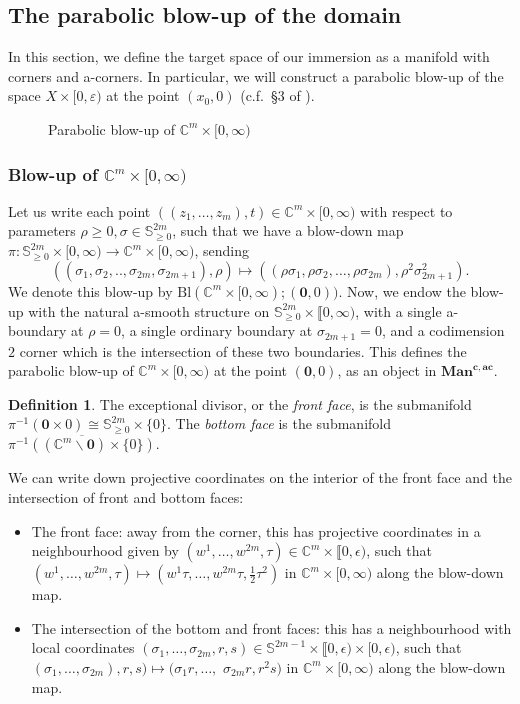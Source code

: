\documentclass[10pt, a4paper]{article}
\theoremstyle{plain}%
\theoremstyle{definition}
\newtheorem{defn}[theorem]{Definition}
\numberwithin{figure}{section}
\numberwithin{equation}{section}
\newcommand{\bC}{\mathbb{C}}
\newcommand{\mancac}{\mathbf{Man}^{\mathbf{c,ac}}}
\newcommand{\ep}{\varepsilon}
\newcommand{\Bl}{\mathrm{Bl}(\mathbb{C}^m\times[0,\infty); (\mathbf{0},0))}
\begin{document}
\subsection{The parabolic blow-up of the domain}
In this section, we define the target space of our immersion as a manifold with corners and a-corners. In particular, we will construct a parabolic blow-up of the space $X\times [0,\ep)$ at the point $(x_0,0)$ (c.f.\ \S 3 of \cite{LMPS23}).

\begin{figure}[!htb]
	\fontsize{9}{9}\selectfont
	\centering
	\def\svgwidth{\columnwidth}
	
	\caption{Parabolic blow-up of $\bC^m\times[0,\infty)$}
	\label{fig2}
\end{figure}
\subsubsection{Blow-up of $\bC^m\times[0,\infty)$} Let us write each point $((z_1,\dots,z_m),t)\in \mathbb{C}^m\times[0,\infty)$ with respect to parameters $\rho\geq0, \sigma\in \mathbb{S}^{2m}_{\geq0}$, such that we have a blow-down map $\pi: \mathbb{S}^{2m}_{\geq0}\times [0,\infty) \rightarrow \mathbb{C}^m\times[0,\infty)$, sending \[((\sigma_1,\sigma_2,..,\sigma_{2m},\sigma_{2m+1}),\rho) \mapsto ((\rho\sigma_1,\rho\sigma_2,\dots,\rho\sigma_{2m}),\rho^2\sigma_{2m+1}^2).\]
We denote this blow-up by $\Bl$. Now, we endow the blow-up with the natural a-smooth structure on $\mathbb{S}^{2m}_{\geq0}\times \llbracket 0,\infty)$, with a single a-boundary at $\rho=0$, a single ordinary boundary at $\sigma_{2m+1}=0$, and a codimension $2$ corner which is the intersection of these two boundaries. This defines the parabolic blow-up of $\mathbb{C}^m\times[0,\infty)$ at the point $(\mathbf{0},0)$, as an object in $\mancac$.

\begin{defn}The exceptional divisor, or the \textit{front face}, is the submanifold $\pi^{-1}(\mathbf{0}\times 0) \cong \mathbb{S}^{2m}_{\geq0}\times\{0\}$. The \textit{bottom face} is the submanifold $\overline{\pi^{-1}((\mathbb{C}^m\backslash \mathbf{0})\times\{0\})}$. 
\end{defn}
	
	We can write down projective coordinates on the interior of the front face and the intersection of front and bottom faces:
\begin{itemize}
    \item The front face: away from the corner, this has projective coordinates in a neighbourhood given by $(w^1,\dots,w^{2m},\tau)\in \mathbb{C}^m\times \llbracket0,\epsilon)$, such that $(w^1,\dots,w^{2m},\tau)\mapsto (w^1\tau,\dots,w^{2m}\tau,\frac{1}{2}\tau^2)$ in $\mathbb{C}^m\times[0,\infty)$ along the blow-down map.
    \item The intersection of the bottom and front faces: this has a neighbourhood with local coordinates $(\sigma_1,\dots,\sigma_{2m},r,s) \in \mathbb{S}^{2m-1}\times \llbracket0,\epsilon)\times [0,\epsilon)$, such that $(\sigma_1,\dots,\sigma_{2m}),r,s)\mapsto (\sigma_1r,\dots,$ $\sigma_{2m}r, r^2s)$ in $\mathbb{C}^m\times[0,\infty)$ along the blow-down map.
\end{itemize}
\end{document}
